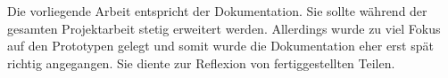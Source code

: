 Die vorliegende Arbeit entspricht der Dokumentation. Sie sollte während der
gesamten Projektarbeit stetig erweitert werden. Allerdings wurde zu viel Fokus
auf den Prototypen gelegt und somit wurde die Dokumentation eher erst spät
richtig angegangen. Sie diente zur Reflexion von fertiggestellten Teilen.

% 
% 
% 
